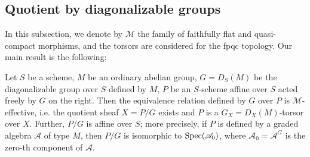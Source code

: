 \subsection{Quotient by diagonalizable groups}
In this subsection, we denote by $\mathcal{M}$ the family of faithfully flat and quasi-compact morphisms, and the torsors are considered for the fpqc topology. Our main result is the following:

\begin{theorem}\label{scheme group diagonalizable free action quotient}
Let $S$ be a scheme, $M$ be an ordinary abelian group, $G=D_S(M)$ be the diagonalizable group over $S$ defined by $M$, $P$ be an $S$-scheme affine over $S$ acted freely by $G$ on the right. Then the equivalence relation defined by $G$ over $P$ is $\mathcal{M}$-effective, i.e. the quotient sheaf $X=P/G$ exists and $P$ is a $G_X=D_X(M)$-torsor over $X$. Further, $P/G$ is affine over $S$; more precisely, if $P$ is defined by a graded algebra $\mathscr{A}$ of type $M$, then $P/G$ is isomorphic to $\mathrm{Spec}(\mathscr{A}_0)$, where $\mathscr{A}_0=\mathscr{A}^G$ is the zero-th component of $\mathscr{A}$.
\end{theorem}

